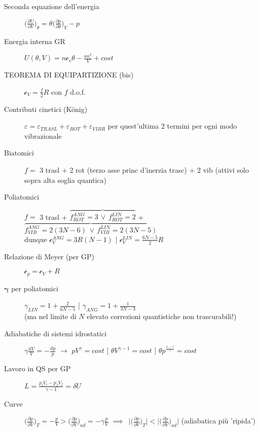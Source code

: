 \documentclass[10pt, oneside]{article}
\begin{document}
\begin{description}
\item[Seconda equazione dell'energia] $\displaystyle \bigg(\frac{\partial U}{\partial V}\bigg)_\theta = \theta \bigg(\frac{\partial p}{\partial \theta}\bigg)_V - p$
\item[Energia interna GR] $\displaystyle U(\theta, V) = n \mathcal{c}_v \theta - \frac{a n^2}{V} + cost$ 
\item[TEOREMA DI EQUIPARTIZIONE (bis)] $\displaystyle \mathcal{c}_V = \frac{f}{2} R$ con $f$ d.o.f.
\item[Contributi cinetici (K\"onig)] $\displaystyle \varepsilon = \varepsilon_{TRASL} + \varepsilon_{ROT} + \varepsilon_{VIBR}$ per quest'ultima 2 termini per ogni modo vibrazionale
\item[Biatomici] $f = $ 3 trasl + 2 rot (terzo asse princ d'inerzia trasc) + 2 vib (attivi solo sopra alta soglia quantica)
\item[Poliatomici] $f =$ 3 trasl + $\displaystyle \overbrace{f_{ROT}^{ANG} = 3 \, \lor \, f_{ROT}^{LIN} =2}$ + $\displaystyle  \overbrace{f_{VIB}^{ANG} = 2(3N - 6) \, \lor \, f_{VIB}^{LIN} = 2(3N - 5)}$
\\dunque $\displaystyle \mathcal{c}_V^{ANG} = 3R (N-1)$ \bigg| $\displaystyle \mathcal{c}_V^{LIN} = \frac{6N - 5}{2}R$
\item[Relazione di Meyer (per GP)] $\boxed{\displaystyle \mathcal{c}_p = \mathcal{c}_V + R}$
\item[$\mathbf{\gamma}$ per poliatomici] $\displaystyle \gamma_{LIN} = 1 + \frac{2}{6N - 5}$ \bigg| $\displaystyle \gamma_{ANG} = 1 + \frac{1}{3N -3}$ \\(ma nel limite di $N$ elevato correzioni quantistiche non trascurabili!)
\item[Adiabatiche di sistemi idrostatici] $\displaystyle \gamma \frac{\mathrm{d}V}{V} = - \frac{\mathrm{d}p}{p}$ $\rightarrow$ $\displaystyle pV^\gamma = cost$ \bigg| $\displaystyle \theta V^{\gamma - 1} = cost$ \bigg| $\displaystyle \theta p^{ \frac{1 - \gamma}{\gamma}} = cost$
\item[Lavoro in QS per GP]$\displaystyle L = \frac{p_i V_i - p_f V_f}{\gamma - 1} = \delta U$
\item[Curve] $\displaystyle \bigg(\frac{\partial p}{\partial V}\bigg)_T = - \frac{p}{V} > \bigg(\frac{\partial p}{\partial V}\bigg)_{ad} = - \gamma \frac{p}{V}$ $\implies \enspace \bigg|\bigg(\displaystyle \frac{\partial p}{\partial V}\bigg)_T\bigg| < \bigg|\bigg(\displaystyle \frac{\partial p}{\partial V}\bigg)_{ad}\bigg|$ (adiabatica più 'ripida')
\end{description}
\end{document}
